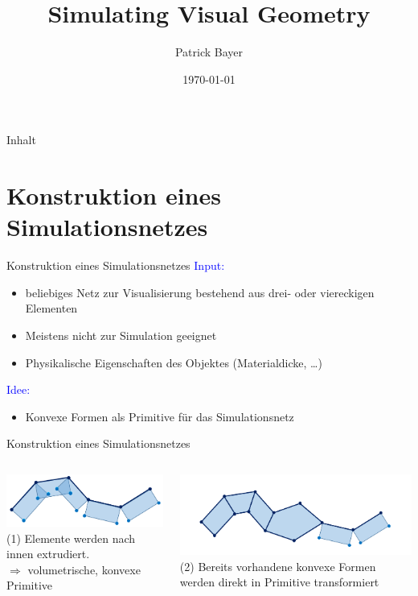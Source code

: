 \documentclass[t]{beamer}
\date{\today}
\title{Simulating Visual Geometry}
\author{Patrick Bayer}
\begin{document}
	\begin{frame}
		\titlepage
	\end{frame}

	\begin{frame}{Inhalt}
		\tableofcontents
	\end{frame}

	\section{Konstruktion eines Simulationsnetzes}
	\begin{frame}{Konstruktion eines Simulationsnetzes}
		\textcolor{blue}{Input:}	
		\begin{itemize}
			\item beliebiges Netz zur Visualisierung bestehend aus drei- oder viereckigen Elementen
			\item Meistens nicht zur Simulation geeignet
			\item Physikalische Eigenschaften des Objektes (Materialdicke, \dots)
		\end{itemize}
		\textcolor{blue}{Idee:}
			\begin{itemize}
					\item Konvexe Formen als Primitive für das Simulationsnetz
			\end{itemize}
		\end{frame}

	\begin{frame}{Konstruktion eines Simulationsnetzes}
		\begin{columns}
			\column{0.5\textwidth}
				\centering
				\includegraphics[scale = 0.4]{PhysicalMeshCreation_Step1.png}\\
				(1) Elemente werden nach innen extrudiert.\\
				$\Rightarrow$ volumetrische, konvexe Primitive
			
			\column{0.5\textwidth}
					\centering
					\includegraphics[scale = 0.31]{PhysicalMeshCreation_2}\\
					(2) Bereits vorhandene konvexe Formen werden direkt in Primitive transformiert
		\end{columns}
	\end{frame}
		
\end{document}
